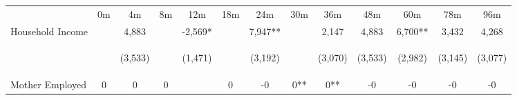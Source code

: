 \begin{tabular}{lcccccccccccc}
\hline \noalign{\smallskip} & 0m & 4m & 8m & 12m & 18m & 24m & 30m & 36m & 48m & 60m & 78m & 96m\\
\noalign{\smallskip}\hline \noalign{\smallskip}Household Income &  & 4,883 &  & -2,569* &  & 7,947** &  & 2,147 & 4,883 & 6,700** & 3,432 & 4,268\\
 & \begin{footnotesize}\end{footnotesize} & \begin{footnotesize}(3,533)\end{footnotesize} & \begin{footnotesize}\end{footnotesize} & \begin{footnotesize}(1,471)\end{footnotesize} & \begin{footnotesize}\end{footnotesize} & \begin{footnotesize}(3,192)\end{footnotesize} & \begin{footnotesize}\end{footnotesize} & \begin{footnotesize}(3,070)\end{footnotesize} & \begin{footnotesize}(3,533)\end{footnotesize} & \begin{footnotesize}(2,982)\end{footnotesize} & \begin{footnotesize}(3,145)\end{footnotesize} & \begin{footnotesize}(3,077)\end{footnotesize}\\
\noalign{\smallskip}Mother Employed & 0 & 0 & 0 &  & 0 & -0 & 0** & 0** & -0 & -0 & -0 & -0\\

\end{tabular}
